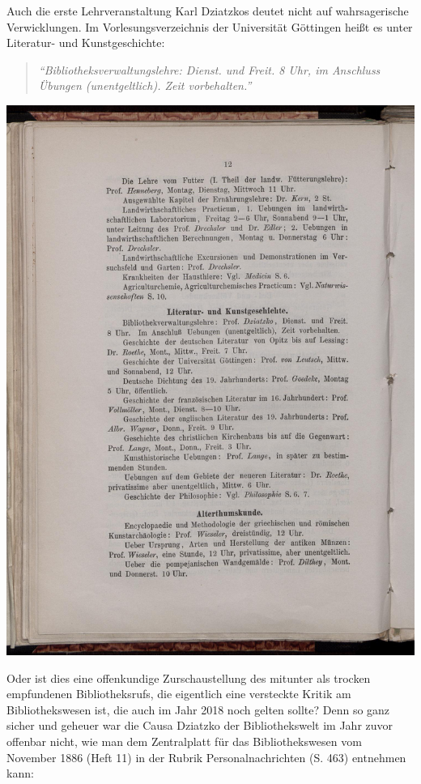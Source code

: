 \documentclass[a4paper,
fontsize=11pt,
oneside,
numbers=noperiodatend,
parskip=half-,
bibliography=totoc,
final
]{scrartcl}
\begin{document}
Auch die erste Lehrveranstaltung Karl Dziatzkos deutet nicht auf
wahrsagerische Verwicklungen. Im Vorlesungsverzeichnis der Universität
Göttingen heißt es unter Literatur- und Kunstgeschichte:

\begin{quote}
\emph{\enquote{Bibliotheksverwaltungslehre: Dienst. und Freit. 8 Uhr, im
Anschluss Übungen (unentgeltlich). Zeit vorbehalten.}}
\end{quote}

\begin{center}
\includegraphics{img/image4.jpg}
\end{center}

Oder ist dies eine offenkundige Zurschaustellung des mitunter als
trocken empfundenen Bibliotheksrufs, die eigentlich eine versteckte
Kritik am Bibliothekswesen ist, die auch im Jahr 2018 noch gelten
sollte? Denn so ganz sicher und geheuer war die Causa Dziatzko der
Bibliothekswelt im Jahr zuvor offenbar nicht, wie man dem Zentralplatt
für das Bibliothekswesen vom November 1886 (Heft 11) in der Rubrik
Personalnachrichten (S. 463) entnehmen kann:
\end{document}
